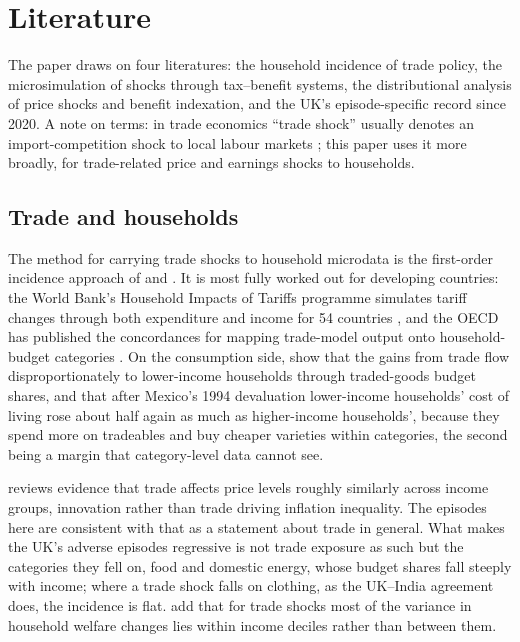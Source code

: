 \section{Literature}\label{sec:literature}

The paper draws on four literatures: the household incidence of trade
policy, the microsimulation of shocks through tax--benefit systems,
the distributional analysis of price shocks and benefit indexation,
and the UK's episode-specific record since 2020. A note on terms: in
trade economics ``trade shock'' usually denotes an import-competition
shock to local labour markets \citep{autordornhanson2013}; this paper
uses it more broadly, for trade-related price and earnings shocks to
households.

\subsection{Trade and households}

The method for carrying trade shocks to household microdata is the
first-order incidence approach of \citet{deaton1989} and
\citet{porto2006}. It is most fully worked out for developing countries: the
World Bank's Household Impacts of Tariffs programme simulates tariff
changes through both expenditure and income for 54 countries
\citep{artucporto2019, artucporto2021}, and the OECD has published the
concordances for mapping trade-model output onto household-budget
categories \citep{luu2020}. On the consumption side,
\citet{fajgelbaumkhandelwal2016} show that the gains from trade flow
disproportionately to lower-income households through traded-goods
budget shares, and \citet{cravinolevchenko2017} that after Mexico's
1994 devaluation lower-income households' cost of living rose about
half again as much as higher-income households', because they spend
more on tradeables and buy cheaper varieties within categories, the
second being a margin that category-level data cannot see.

\citet{jaravel2021} reviews evidence that trade affects price levels
roughly similarly across income groups, innovation rather than trade
driving inflation inequality. The episodes here are consistent with
that as a statement about trade in general. What makes the UK's
adverse episodes regressive is not trade exposure as such but the
categories they fell on, food and domestic energy, whose budget shares
fall steeply with income; where a
trade shock falls on clothing, as the UK--India agreement does, the
incidence is flat. \citet{borusyakjaravel2024} add that for trade
shocks most of the variance in household welfare changes lies within
income deciles rather than between them.

